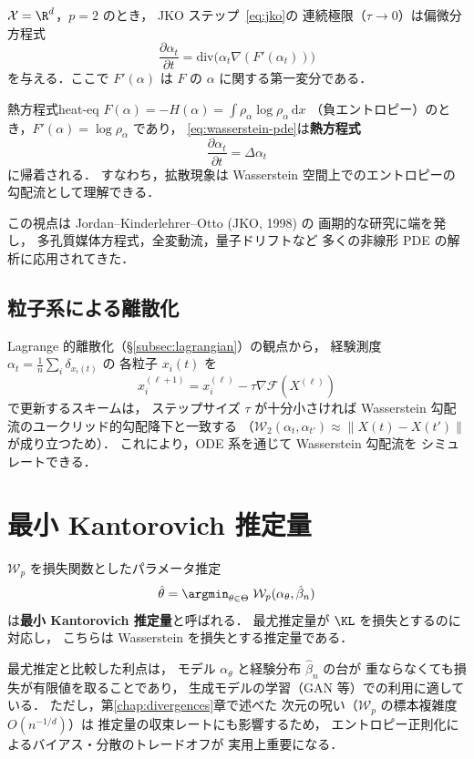 $\mathcal{X} = \R^d$，$p = 2$ のとき，
JKO ステップ~\eqref{eq:jko}の
連続極限（$\tau \to 0$）は偏微分方程式
\begin{equation}\label{eq:wasserstein-pde}
  \frac{\partial \alpha_t}{\partial t}
  = \mathrm{div}\bigl(\alpha_t \nabla (F'(\alpha_t))\bigr)
\end{equation}
を与える．ここで $F'(\alpha)$ は
$F$ の $\alpha$ に関する第一変分である．

\begin{example}{熱方程式}{heat-eq}
$F(\alpha) = -H(\alpha) = \int \rho_\alpha \log \rho_\alpha\, \mathrm{d}x$
（負エントロピー）のとき，$F'(\alpha) = \log \rho_\alpha$ であり，
\eqref{eq:wasserstein-pde}は\textbf{熱方程式}
\[
  \frac{\partial \alpha_t}{\partial t} = \Delta \alpha_t
\]
に帰着される．
すなわち，拡散現象は
Wasserstein 空間上でのエントロピーの勾配流として理解できる．
\end{example}

この視点は Jordan--Kinderlehrer--Otto (JKO, 1998) の
画期的な研究に端を発し，
多孔質媒体方程式，全変動流，量子ドリフトなど
多くの非線形 PDE の解析に応用されてきた．

\subsection{粒子系による離散化}\label{subsec:particle-gf}

Lagrange 的離散化（§\ref{subsec:lagrangian}）の観点から，
経験測度 $\alpha_t = \frac{1}{n}\sum_i \delta_{x_i(t)}$ の
各粒子 $x_i(t)$ を
\[
  x_i^{(\ell+1)} = x_i^{(\ell)} - \tau \nabla \mathcal{F}(X^{(\ell)})
\]
で更新するスキームは，
ステップサイズ $\tau$ が十分小さければ
Wasserstein 勾配流のユークリッド的勾配降下と一致する
（$\mathcal{W}_2(\alpha_t, \alpha_{t'}) \approx \|X(t) - X(t')\|$
が成り立つため）．
これにより，ODE 系を通じて Wasserstein 勾配流を
シミュレートできる．


\section{最小 Kantorovich 推定量}\label{sec:min-kantorovich}

$\mathcal{W}_p$ を損失関数としたパラメータ推定
\[
  \hat{\theta} = \argmin_{\theta \in \Theta}\;
  \mathcal{W}_p(\alpha_\theta, \hat{\beta}_n)
\]
は\textbf{最小 Kantorovich 推定量}と呼ばれる．
最尤推定量が $\KL$ を損失とするのに対応し，
こちらは Wasserstein を損失とする推定量である．

最尤推定と比較した利点は，
モデル $\alpha_\theta$ と経験分布 $\hat{\beta}_n$ の台が
重ならなくても損失が有限値を取ることであり，
生成モデルの学習（GAN 等）での利用に適している．
ただし，第\ref{chap:divergences}章で述べた
次元の呪い（$\mathcal{W}_p$ の標本複雑度 $O(n^{-1/d})$）は
推定量の収束レートにも影響するため，
エントロピー正則化によるバイアス・分散のトレードオフが
実用上重要になる．
